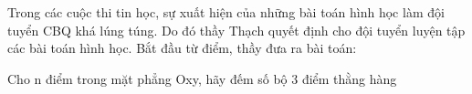 Trong các cuộc thi tin học, sự xuất hiện của những bài toán hình học làm đội tuyển CBQ khá lúng túng. Do đó thầy Thạch quyết định cho đội tuyển luyện tập các bài toán hình học. Bắt đầu từ điểm, thầy đưa ra bài toán:  

   Cho n điểm trong mặt phẳng Oxy, hãy đếm số bộ 3 điểm thằng hàng  

\